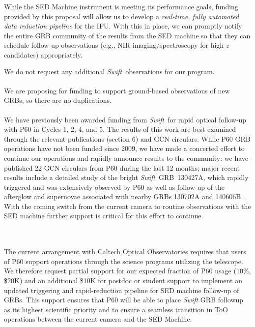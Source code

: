 \documentclass[letterpaper,11pt]{article}
\newcommand{\swift}{\textit{Swift}}
\begin{document}
While the SED Machine instrument is meeting its performance goals, funding 
provided by this proposal will allow us to develop a \textit{real-time,
fully automated data reduction pipeline} for the IFU.  With this in place,
we can promptly notify the entire GRB community of the results from the
SED machine so that they can schedule follow-up observations (e.g.,
NIR imaging/spectroscopy for high-$z$ candidates) appropriately.

We do not request any additional \swift\ observations for our program. \\

\smallskip\\
We are proposing for funding to support ground-based observations of new GRBs, so 
there are no duplications.\\

\smallskip\\
We have previously been awarded funding from \swift\ for rapid optical
follow-up with P60 in Cycles 1, 2, 4, and 5.  The results of this work are best
examined through the relevant publications (section 6) and GCN circulars.  
While P60 GRB operations have not been funded since 2009, we have made a 
concerted effort to continue our operations and rapidly announce results
to the community: we have published 22 GCN circulars from P60 during the last 
12 months; 
major recent results include a detailed study of the bright 
\swift\ GRB\ 130427A, which rapidly triggered and was extensively observed by 
P60  \citep{pcc+2013} as well as follow-up of the afterglow
and supernovae associated with nearby GRBs 130702A \citep{sck+13,tcs+15} and 
140606B \citep{skc+15,cdp+15}.  
With the coming switch from the current camera to routine observations with 
the SED machine further support is critical for this effort to continue.
\\


\smallskip\\
\begin{multicols}{2}
{\footnotesize


}
\end{multicols}

\smallskip\\
The current arrangement with Caltech Optical Observatories requires that
users of P60 support operations through the science programs
utilizing the telescope. We therefore request partial support for
our expected fraction of P60 usage ($10\%$, \$20K) and an additional \$10K 
for postdoc or student support to implement an updated triggering and rapid-reduction
pipeline for SED machine follow-up of GRBs.
This support ensures
that P60 will be able to place {\em Swift} GRB followup as its
highest scientific priority and to ensure a seamless transition in ToO operations
between the current camera and the SED Machine.
\end{document}
